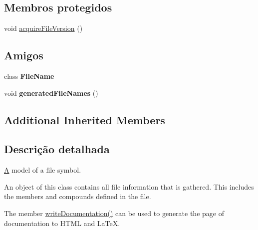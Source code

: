 \subsection*{Membros protegidos}
\begin{DoxyCompactItemize}
\item 
void \hyperlink{class_file_def_a58bd03e1a48023002f814d6a336630b3}{acquire\-File\-Version} ()
\end{DoxyCompactItemize}
\subsection*{Amigos}
\begin{DoxyCompactItemize}
\item 
\hypertarget{class_file_def_a5038284eb3ca46435712b365a038056a}{class {\bfseries File\-Name}}\label{class_file_def_a5038284eb3ca46435712b365a038056a}

\item 
\hypertarget{class_file_def_a35cc830de6fcd806519b598217001e5a}{void {\bfseries generated\-File\-Names} ()}\label{class_file_def_a35cc830de6fcd806519b598217001e5a}

\end{DoxyCompactItemize}
\subsection*{Additional Inherited Members}


\subsection{Descrição detalhada}
\hyperlink{class_a}{A} model of a file symbol.

An object of this class contains all file information that is gathered. This includes the members and compounds defined in the file.

The member \hyperlink{class_file_def_a0c85f3695c99f7b1aeb762bbdabc8d62}{write\-Documentation()} can be used to generate the page of documentation to H\-T\-M\-L and La\-Te\-X. 

